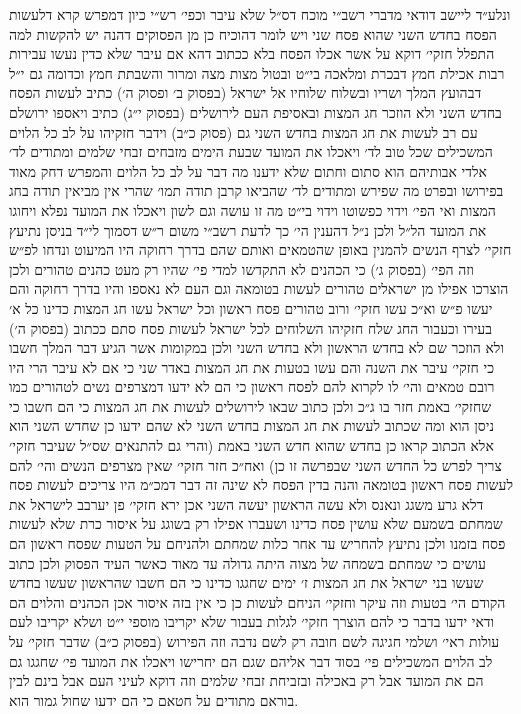 \documentclass[12pt, openany]{book}
\begin{document}
\begin{multicols}{2}
ונלע״ד ליישב דודאי מדברי רשב״י מוכח דס״ל שלא עיבר וכפי׳ רש״י כיון דמפרש קרא דלעשות הפסח בחדש השני שהוא פסח שני ויש לומר דהוכיח כן מן הפסוקים דהנה יש להקשות למה התפלל חזקי׳ דוקא על אשר אכלו הפסח בלא ככתוב דהא אם עיבר שלא כדין נעשו עבירות רבות אכילת חמץ דבכרת ומלאכה בי״ט ובטול מצות מצה ומרור והשבתת חמץ וכדומה גם י״ל דבהועץ המלך ושריו ובשלוח שלוחיו אל ישראל (בפסוק ב׳ ופסוק ה׳) כתיב לעשות הפסח בחדש השני ולא הוזכר חג המצות ובאסיפת העם לירושלים (בפסוק י״ג) כתיב ויאספו ירושלם עם רב לעשות את חג המצות בחדש השני גם (פסוק כ״ב) וידבר חזקיהו על לב כל הלוים המשכילים שכל טוב לד׳ ויאכלו את המועד שבעת הימים מזבחים זבחי שלמים ומתודים לד׳ אלדי אבותיהם הוא סתום וחתום שלא ידענו מה דבר על לב כל הלוים והמפרש דחק מאוד בפירושו ובפרט מה שפירש ומתודים לד׳ שהביאו קרבן תודה תמו׳ שהרי אין מביאין תודה בחג המצות ואי הפי׳ וידוי כפשוטו וידוי בי״ט מה זו עושה וגם לשון ויאכלו את המועד נפלא ויחוגו את המועד הל״ל ולכן נ״ל דהענין הי׳ כך לדעת רשב״י משום ר״ש דסמוך לי״ד בניסן נתיעץ חזקי׳ לצרף הנשים להמנין באופן שהטמאים ואותם שהם בדרך רחוקה היו המיעוט ונדחו לפ״ש וזה הפי׳ (בפסוק ג׳) כי הכהנים לא התקדשו למדי פי׳ שהיו רק מעט כהנים טהורים ולכן הוצרכו אפילו מן ישראלים טהורים לעשות בטומאה וגם העם לא נאספו והיו בדרך רחוקה והם יעשו פ״ש וא״כ עשו חזקי׳ ורוב טהורים פסח ראשון וכל ישראל עשו חג המצות כדינו כל א׳ בעירו וכעבור החג שלח חזקיהו השלוחים לכל ישראל לעשות פסח סתם ככתוב (בפסוק ה׳) ולא הוזכר שם לא בחדש הראשון ולא בחדש השני ולכן במקומות אשר הגיע דבר המלך חשבו כי חזקי׳ עיבר את השנה והם עשו בטעות את חג המצות באדר שני כי אם לא עיבר הרי היו רובם טמאים והי׳ לו לקרוא להם לפסח ראשון כי הם לא ידעו דמצרפים נשים לטהורים כמו שחזקי׳ באמת חזר בו ג״כ ולכן כתוב שבאו לירושלים לעשות את חג המצות כי הם חשבו כי ניסן הוא ומה שכתוב לעשות את חג המצות בחדש השני לא שהם ידעו כן שחדש השני הוא אלא הכתוב קראו כן בחדש שהוא חדש השני באמת (והרי גם להתנאים שס״ל שעיבר חזקי׳ צריך לפרש כל החדש השני שבפרשה זו כן) ואח״כ חזר חזקי׳ שאין מצרפים הנשים והי׳ להם לעשות פסח ראשון בטומאה והנה בדין הפסח לא שינה זה דבר דמכ״מ היו צריכים לעשות פסח דלא גרע משגג ונאנס ולא עשה הראשון יעשה השני אכן ירא חזקי׳ פן יערבב לישראל את שמחתם בשמעם שלא עושין פסח כדינו ושעברו אפילו רק בשוגג על איסור כרת שלא לעשות פסח בזמנו ולכן נתיעץ להחריש עד אחר כלות שמחתם ולהניחם על הטעות שפסח ראשון הם עושים כי שמחתם בשמחה של מצוה היתה גדולה עד מאוד כאשר העיד הפסוק ולכן כתוב שעשו בני ישראל את חג המצות ז׳ ימים שחגגו כדינו כי הם חשבו שהראשון שעשו בחדש הקודם הי׳ בטעות וזה עיקר וחזקי׳ הניחם לעשות כן כי אין בזה איסור אכן הכהנים והלוים הם ודאי ידעו בדבר כי להם הוצרך חזקי׳ לגלות בעבור שלא יקריבו מוספי י״ט ושלא יקריבו לעם עולות ראי׳ ושלמי חגיגה לשם חובה רק לשם נדבה וזה הפירוש (בפסוק כ״ב) שדבר חזקי׳ על לב הלוים המשכילים פי׳ בסוד דבר אליהם שגם הם יחרישו ויאכלו את המועד פי׳ שחגגו גם הם את המועד אבל רק באכילה ובזביחת זבחי שלמים וזה דוקא לעיני העם אבל בינם לבין בוראם מתודים על חטאם כי הם ידעו שחול גמור הוא.\\\vspace{0pt}


\end{multicols}
\end{document}
